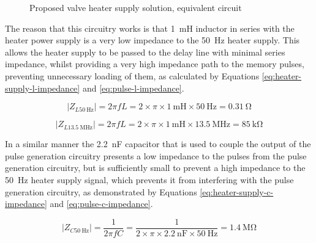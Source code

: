 \begin{figure}[ht]
	\caption{Proposed valve heater supply solution, equivalent circuit}
	\label{fig:valve-supply-equiv-cct}
\end{figure}


The reason that this circuitry works is that \SI{1}{\milli\henry} inductor in series with the heater power supply is a very low impedance to the \SI{50}{\hertz} heater supply. This allows the heater supply to be passed to the delay line with minimal series impedance, whilst providing a very high impedance path to the memory pulses, preventing unnecessary loading of them, as calculated by Equations \ref{eq:heater-supply-l-impedance} and \ref{eq:pulse-l-impedance}.

\begin{equation}
| Z_{L\SI{50}{\hertz}} | = 2 \pi f L = 2 \times \pi \times \SI{1}{\milli\henry} \times \SI{50}{\hertz} = \SI{0.31}{\ohm} \label{eq:heater-supply-l-impedance} 
\end{equation}

\begin{equation}
| Z_{L\SI{13.5}{\mega\hertz}} | = 2 \pi f L = 2 \times \pi \times \SI{1}{\milli\henry} \times \SI{13.5}{\mega\hertz} = \SI{85}{\kilo\ohm} \label{eq:pulse-l-impedance}
\end{equation}

In a similar manner the \SI{2.2}{\nano\farad} capacitor that is used to couple the output of the pulse generation circuitry presents a low impedance to the pulses from the pulse generation circuitry, but is sufficiently small to prevent a high impedance to the \SI{50}{\hertz} heater supply signal, which prevents it from interfering with the pulse generation circuitry, as demonstrated by Equations \ref{eq:heater-supply-c-impedance} and \ref{eq:pulse-c-impedance}.

\begin{equation}
| Z_{C\SI{50}{\hertz}} | = \frac{1}{2 \pi f C} = \frac{1}{2 \times \pi \times \SI{2.2}{\nano\farad} \times \SI{50}{\hertz}} = \SI{1.4}{\mega\ohm} \label{eq:heater-supply-c-impedance} 
\end{equation}


